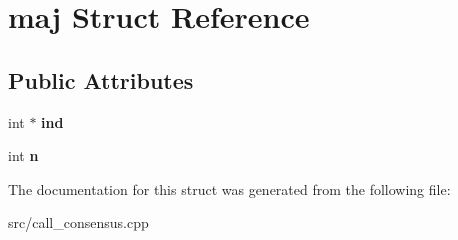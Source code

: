 \hypertarget{structmaj}{}\section{maj Struct Reference}
\label{structmaj}
\subsection*{Public Attributes}
\begin{DoxyCompactItemize}
\item 
\mbox{\label{structmaj_aa2673f706808abc37cd8e3a6270c6f61}} 
int $\ast$ {\bfseries ind}
\item 
\mbox{\label{structmaj_ae7de5964f5dc96404485739b68f434fe}} 
int {\bfseries n}
\end{DoxyCompactItemize}


The documentation for this struct was generated from the following file\+:\begin{DoxyCompactItemize}
\item 
src/call\+\_\+consensus.\+cpp\end{DoxyCompactItemize}
